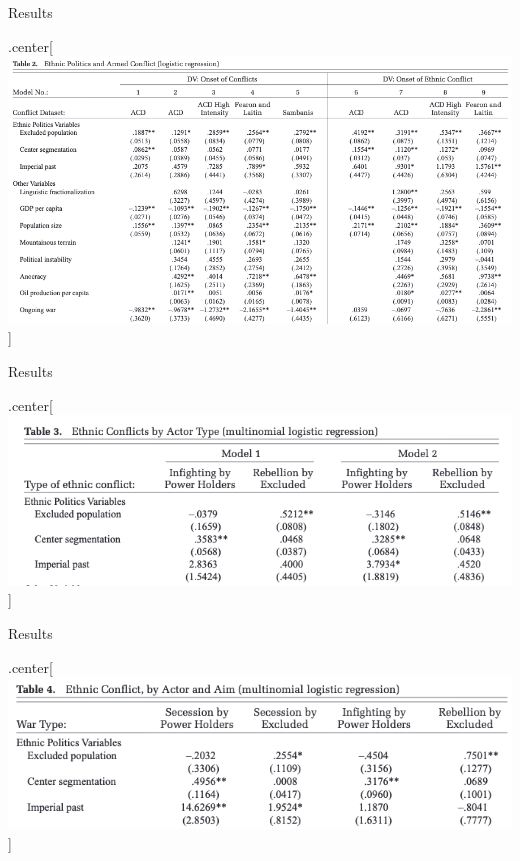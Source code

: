 \documentclass[ignorenonframetext,]{beamer}
\begin{document}
\begin{frame}{Results}

\begin{block}{.center{[}\includegraphics{wimmer02.png}{]}}

\end{block}

\end{frame}

\begin{frame}{Results}

\begin{block}{.center{[}\includegraphics{wimmer03.png}{]}}

\end{block}

\end{frame}

\begin{frame}{Results}

\begin{block}{.center{[}\includegraphics{wimmer04.png}{]}}

\end{block}

\end{frame}
\end{document}
